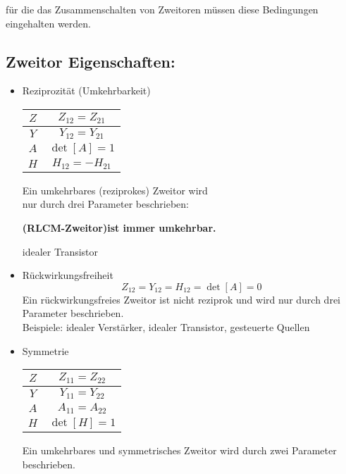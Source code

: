 für die das Zusammenschalten von Zweitoren müssen diese Bedingungen
eingehalten werden.

\subsection{Zweitor Eigenschaften:}
\begin{itemize}
    \item Reziprozit\"at (Umkehrbarkeit)
        \begin{center}
            \begin{tabular}{|c|c|}
                \hline
                $Z$&  $Z_{12} = Z_{21}$\\
                \hline
                $Y$&  $Y_{12} = Y_{21}$\\
                \hline
                $A$&  $\operatorname{det}[A] = 1$\\
                \hline
                $H$&  $H_{12} = -H_{21}$\\
                \hline
            \end{tabular}
        \end{center}
        Ein umkehrbares (reziprokes) Zweitor wird\\ nur durch drei Parameter
        beschrieben:

        \footnotesize
        \textbf{(RLCM-Zweitor)ist immer umkehrbar.}

        {\color{red}{Gegenbeispiel:}} idealer Transistor
        \normalsize
    \item R\"uckwirkungsfreiheit\\
        $$Z_{12}=Y_{12}=H_{12}=\operatorname{det}[A]=0$$
        Ein rückwirkungsfreies Zweitor ist nicht reziprok und wird nur durch
        drei Parameter beschrieben.\\
        \footnotesize
        Beispiele: idealer Verstärker, idealer Transistor, gesteuerte Quellen
        \normalsize
    \item Symmetrie
        \begin{center}
            \begin{tabular}{|c|c|}
                \hline
                $Z$&  $Z_{11} = Z_{22}$\\
                \hline
                $Y$&  $Y_{11} = Y_{22}$\\
                \hline
                $A$&  $A_{11} = A_{22}$\\
                \hline
                $H$&  $\operatorname{det}[H]=1$\\
                \hline
            \end{tabular}
        \end{center}
        Ein umkehrbares und symmetrisches Zweitor wird durch zwei Parameter
        beschrieben.
\end{itemize}

